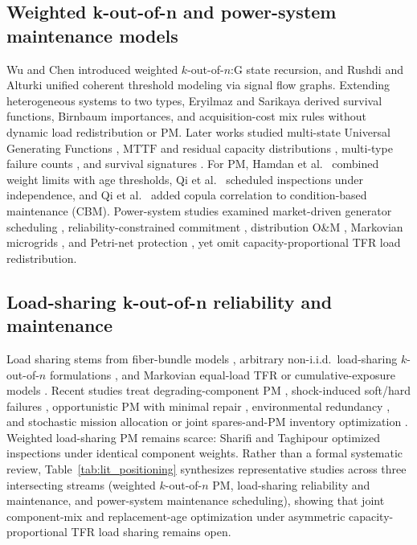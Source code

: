 \documentclass{elektr}
\begin{document}
\subsection{Weighted k-out-of-n and power-system maintenance models}
Wu and Chen \cite{wu1994} introduced weighted $k$-out-of-$n$:G state recursion, and Rushdi and Alturki \cite{rushdi2018} unified coherent threshold modeling via signal flow graphs. Extending heterogeneous systems to two types, Eryilmaz and Sarikaya \cite{eryilmaz2014two} derived survival functions, Birnbaum importances, and acquisition-cost mix rules without dynamic load redistribution or PM. Later works studied multi-state Universal Generating Functions \cite{li2008}, $\mathrm{MTTF}$ and residual capacity distributions \cite{eryilmaz2015mttf,eryilmaz2015,eryilmaz2021}, multi-type failure counts \cite{eryilmaz2018}, and survival signatures \cite{hamdan2024}. For PM, Hamdan et al.\ \cite{hamdan2021} combined weight limits with age thresholds, Qi et al.\ \cite{qi2024} scheduled inspections under independence, and Qi et al.\ \cite{qi2026} added copula correlation to condition-based maintenance (CBM). Power-system studies examined market-driven generator scheduling \cite{fotuhi2014,golmohamadi2014}, reliability-constrained commitment \cite{heidari2016}, distribution O\&M \cite{hashemi2013}, Markovian microgrids \cite{almuhaini2017}, and Petri-net protection \cite{kumari2026}, yet omit capacity-proportional TFR load redistribution.

\subsection{Load-sharing k-out-of-n reliability and maintenance}
Load sharing stems from fiber-bundle models \cite{daniels1945}, arbitrary non-i.i.d.\ load-sharing $k$-out-of-$n$ formulations \cite{liu1998}, and Markovian equal-load TFR or cumulative-exposure models \cite{amari2008,taghipour2015}. Recent studies treat degrading-component PM \cite{liu2016}, shock-induced soft/hard failures \cite{che2020,huang2023}, opportunistic PM with minimal repair \cite{jamali2022}, environmental redundancy \cite{hao2024}, and stochastic mission allocation or joint spares-and-PM inventory optimization \cite{ghnimi2025,mannai2026,zhao2025}. Weighted load-sharing PM remains scarce: Sharifi and Taghipour \cite{sharifi2023} optimized inspections under identical component weights. Rather than a formal systematic review, Table~\ref{tab:lit_positioning} synthesizes representative studies across three intersecting streams (weighted $k$-out-of-$n$ PM, load-sharing reliability and maintenance, and power-system maintenance scheduling), showing that joint component-mix and replacement-age optimization under asymmetric capacity-proportional TFR load sharing remains open.
\end{document}
